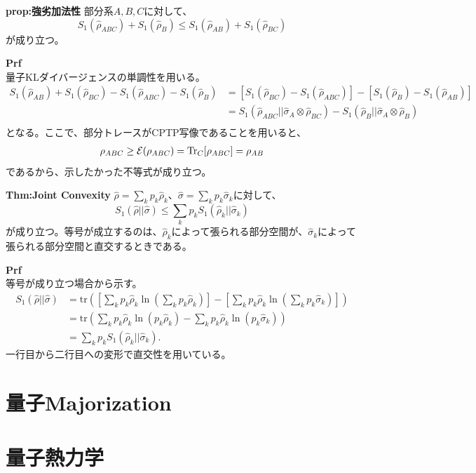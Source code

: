 \documentclass[a4paper,11pt]{jsarticle}
\numberwithin{equation}{section}
\begin{document}
\begin{itembox}[l]{\textbf{prop:強劣加法性}}
    部分系$A,B,C$に対して、
    \begin{equation}
        S_1(\hat{\rho}_{ABC}) + S_1(\hat{\rho}_B) \leq S_1(\hat{\rho}_{AB}) + S_1(\hat{\rho}_{BC})
    \end{equation}
    が成り立つ。
\end{itembox}
\textbf{Prf}\\
量子KLダイバージェンスの単調性を用いる。\\
\begin{align}
    S_1(\hat{\rho}_{AB}) + S_1(\hat{\rho}_{BC}) - S_1(\hat{\rho}_{ABC}) - S_1(\hat{\rho}_B) 
    &=[S_1(\hat{\rho}_{BC}) - S_1(\hat{\rho}_{ABC})] - [S_1(\hat{\rho}_{B}) - S_1(\hat{\rho}_{AB})]\\
    &= S_1(\hat{\rho}_{ABC}||\hat{\sigma}_A \otimes \hat{\rho}_{BC}) - S_1(\hat{\rho}_{B}||\hat{\sigma}_A \otimes \hat{\rho}_{B})\\
\end{align}
となる。ここで、部分トレースがCPTP写像であることを用いると、
\begin{align}
    \rho_{ABC} \geq \mathcal{E}(\rho_{ABC}) =\Trace_C[\rho_{ABC}] = \rho_{AB}
\end{align}
であるから、示したかった不等式が成り立つ。\hfill \qedsymbol\\

\begin{itembox}[l]{\textbf{Thm:Joint Convexity}}
    $\hat{\rho} = \sum_{k} p_k \hat{\rho}_k$、$\hat{\sigma} = \sum_{k} p_k \hat{\sigma}_k$に対して、
    \begin{equation}
        S_1(\hat{\rho}||\hat{\sigma}) \leq \sum_{k} p_k S_1(\hat{\rho}_k||\hat{\sigma}_k)
    \end{equation}
    が成り立つ。等号が成立するのは、$\hat{\rho}_k$によって張られる部分空間が、$\hat{\sigma}_k$によって張られる部分空間と直交するときである。
\end{itembox}
\textbf{Prf}\\
等号が成り立つ場合から示す。
\begin{align}
    S_1(\hat{\rho} || \hat{\sigma}) &= \text{tr} \left( \left[ \sum_k p_k \hat{\rho}_k \ln\left(\sum_k p_k \hat{\rho}_k\right) \right] - \left[ \sum_k p_k \hat{\rho}_k \ln\left(\sum_k p_k \hat{\sigma}_k\right) \right] \right) \\
    &= \text{tr} \left( \sum_k p_k \hat{\rho}_k \ln(p_k \hat{\rho}_k) - \sum_k p_k \hat{\rho}_k \ln(p_k \hat{\sigma}_k) \right) \\
    &= \sum_k p_k S_1(\hat{\rho}_k || \hat{\sigma}_k).
\end{align}
一行目から二行目への変形で直交性を用いている。

\section{量子Majorization}

\section{量子熱力学}
\end{document}
